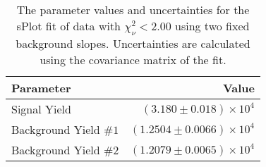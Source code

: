 
\begin{table}[ht]
    \begin{center}
        \begin{tabular}{lr}\toprule
            Parameter & Value \\\midrule
            Signal Yield & $(3.180 \pm 0.018) \times 10^{4}$ \\
            Background Yield $\#1$ & $(1.2504 \pm 0.0066) \times 10^{4}$ \\
            Background Yield $\#2$ & $(1.2079 \pm 0.0065) \times 10^{4}$ \\\bottomrule
        \end{tabular}
        \caption{The parameter values and uncertainties for the sPlot fit of data with $\chi^2_\nu < 2.00$ using two fixed background slopes. Uncertainties are calculated using the covariance matrix of the fit.}\label{tab:splot-fit-results-chisqdof-2.00-fixed-2}
    \end{center}
\end{table}

